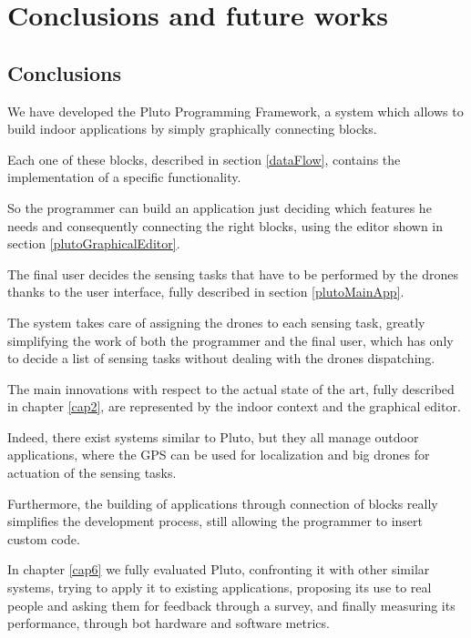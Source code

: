 \chapter{Conclusions and future works}
\label{cap7}


\section{Conclusions}

We have developed the Pluto Programming Framework, a system which allows to build indoor applications by simply graphically connecting blocks.

Each one of these blocks, described in section \ref{dataFlow}, contains the implementation of a specific functionality.

So the programmer can build an application just deciding which features he needs and consequently connecting the right blocks, using the editor shown in section \ref{plutoGraphicalEditor}.

The final user decides the sensing tasks that have to be performed by the drones thanks to the user interface, fully described in section \ref{plutoMainApp}.

The system takes care of assigning the drones to each sensing task, greatly simplifying the work of both the programmer and the final user, which has only to decide a list of sensing tasks without dealing with the drones dispatching. 

The main innovations with respect to the actual state of the art, fully described in chapter \ref{cap2}, are represented by the indoor context and the graphical editor.

Indeed, there exist systems similar to Pluto, but they all manage outdoor applications, where the GPS can be used for localization and big drones for actuation of the sensing tasks.

Furthermore, the building of applications through connection of blocks really simplifies the development process, still allowing the programmer to insert custom code.

In chapter \ref{cap6} we fully evaluated Pluto, confronting it with other similar systems, trying to apply it to existing applications, proposing its use to real people and asking them for feedback through a survey, and finally measuring its performance, through bot hardware and software metrics.

